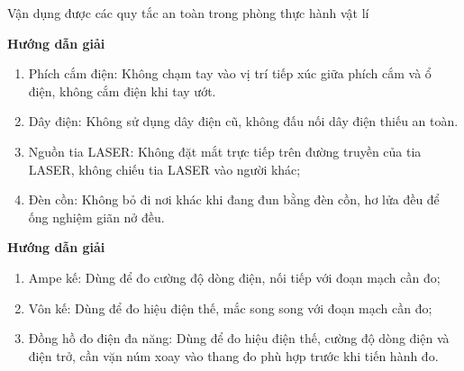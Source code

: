 \begin{dang}{Vận dụng được các quy tắc an toàn trong phòng thực hành vật lí}
	{	\begin{center}
			\textbf{Hướng dẫn giải}
		\end{center}
		
		\begin{enumerate}
			\item Phích cắm điện: Không chạm tay vào vị trí tiếp xúc giữa phích cắm và ổ điện, không cắm điện khi tay ướt.
			\item Dây điện: Không sử dụng dây điện cũ, không đấu nối dây điện thiếu an toàn.
			\item Nguồn tia LASER: Không đặt mắt trực tiếp trên đường truyền của tia LASER, không chiếu tia LASER vào người khác;
			\item Đèn cồn: Không bỏ đi nơi khác khi đang đun bằng đèn cồn, hơ lửa đều để ống nghiệm giãn nở đều.
		\end{enumerate}
	}
	{\begin{center}
			\textbf{Hướng dẫn giải}
		\end{center}
		
		\begin{enumerate}
			\item Ampe kế: Dùng để đo cường độ dòng điện, nối tiếp với đoạn mạch cần đo;
			\item Vôn kế: Dùng để đo hiệu điện thế, mắc song song với đoạn mạch cần đo;
			\item Đồng hồ đo điện đa năng: Dùng để đo hiệu điện thế, cường độ dòng điện và điện trở, cần vặn núm xoay vào thang đo phù hợp trước khi tiến hành đo.
		\end{enumerate}
	}
\end{dang}